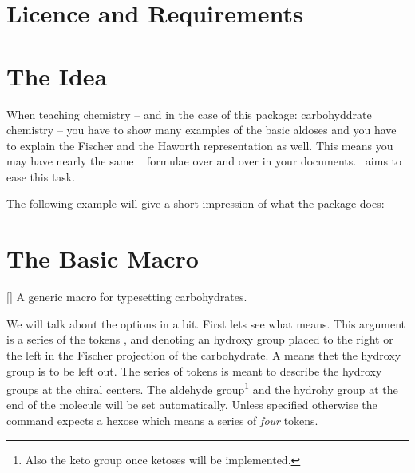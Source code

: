 \documentclass[load-preamble+,scrartcl={DIV10}]{cnltx-doc}
\begin{document}
\section{Licence and Requirements}
\license

\section{The Idea}
When teaching chemistry -- and in the case of this package: carbohyddrate
chemistry -- you have to show many examples of the basic aldoses and you have
to explain the Fischer and the Haworth representation as well. This means you
may have nearly the same ~\cite{pkg:chemfig} formulae over and
over in your documents.  \carbohydrates\ aims to ease this task.

The following example will give a short impression of what the package does:
\begin{example}
  \glucose
  \glucose[model={fischer=skeleton}]
  \setatomsep{2.5em}
  \glucose[model=haworth,ring]
  \glucose[model=haworth,ring=furanose]
\end{example}

\section{The Basic Macro}
\begin{commands}
  []
    A generic macro for typesetting carbohydrates.
\end{commands}
We will talk about the options in a bit. First lets see what 
means.  This argument is a series of the tokens ,  and
 denoting an hydroxy group placed to the right or the left in the
Fischer projection of the carbohydrate.  A  means thet the hydroxy
group is to be left out.  The series of tokens is meant to describe the
hydroxy groups at the chiral centers. The aldehyde group\footnote{Also the
  keto group once ketoses will be implemented.} and the hydrohy group at the
end of the molecule will be set automatically.  Unless specified otherwise the
command expects a hexose which means a series of \emph{four} tokens.

\begin{example}
  \setatomsep{2.5em}\chemnameinit{}
\end{example}
\end{document}
